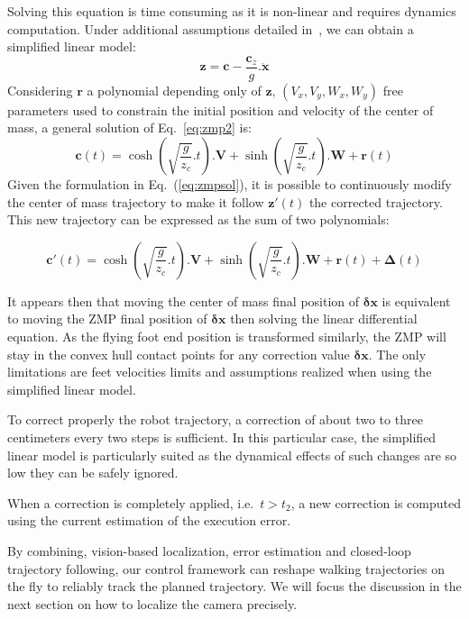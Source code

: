 Solving this equation is time consuming as it is non-linear and
requires dynamics computation. Under additional assumptions detailed
in~\cite{Kajita01iros}, we can obtain a simplified linear model:
%
\begin{equation} \label{eq:zmp2}
  \mathbf{z} = \mathbf{c} - \frac{\mathbf{c}_z}{g} . \ddot{\mathbf{x}}
\end{equation}
%
Considering $\mathbf{r}$ a polynomial depending only of $\mathbf{z}$,
$(V_x, V_y, W_x, W_y)$ free parameters used to constrain the initial
position and velocity of the center of mass, a general solution of
Eq.~\ref{eq:zmp2} is:
%
\begin{equation} \label{eq:zmpsol}
  \mathbf{c}(t) = \cosh(\sqrt{\frac{g}{z_c}}.t) . \mathbf{V} + \sinh(\sqrt{\frac{g}{z_c}}.t) . \mathbf{W} + \mathbf{r}(t)
\end{equation}
%
Given the formulation in Eq.~(\ref{eq:zmpsol}), it is possible to
continuously modify the center of mass trajectory to make it follow
\mbox{$\mathbf{z}'(t)$} the corrected trajectory. This new
trajectory can be expressed as the sum of two polynomials:

\begin{equation} \label{eq:zmpsolcor}
  \mathbf{c}'(t) = \cosh(\sqrt{\frac{g}{z_c}}.t) . \mathbf{V} +
  \sinh(\sqrt{\frac{g}{z_c}}.t) . \mathbf{W} + \mathbf{r}(t) + \mathbf{\Delta}(t)
\end{equation}

It appears then that moving the center of mass final position of
$\mathbf{\delta x}$ is equivalent to moving the ZMP final position of
$\mathbf{\delta x}$ then solving the linear differential equation. As
the flying foot end position is transformed similarly, the ZMP will
stay in the convex hull contact points for any correction value
$\mathbf{\delta x}$. The only limitations are feet velocities limits
and assumptions realized when using the simplified linear model.

To correct properly the robot trajectory, a correction of about two to
three centimeters every two steps is sufficient. In this particular
case, the simplified linear model is particularly suited as the
dynamical effects of such changes are so low they can be safely
ignored.

When a correction is completely applied, i.e.\ $t > t_2$, a new
correction is computed using the current estimation of the execution
error.

By combining, vision-based localization, error estimation and
closed-loop trajectory following, our control framework can reshape
walking trajectories on the fly to reliably track the planned
trajectory. We will focus the discussion in the next section on how to
localize the camera precisely.

